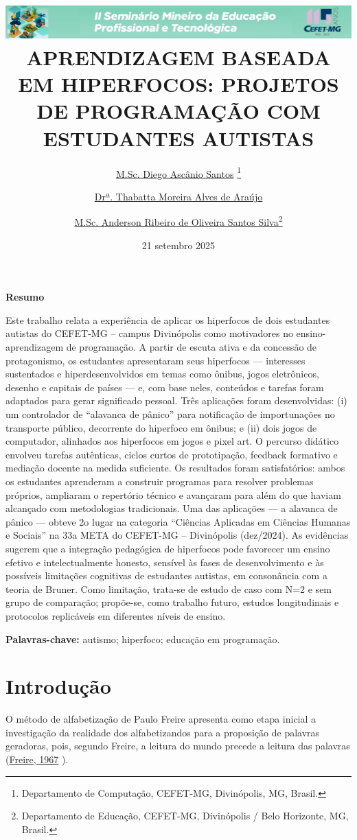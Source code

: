 \documentclass[
  12pt,
  a4paper,
]{article}
\title{\includegraphics[width=1\textwidth,height=\textheight]{./images/logo.png}
APRENDIZAGEM BASEADA EM HIPERFOCOS: PROJETOS DE PROGRAMAÇÃO COM
ESTUDANTES AUTISTAS}
\author{\href{mailto:ascanio@cefetmg.br}{M.Sc. Diego Ascânio Santos}
\thanks{Departamento de Computação, CEFET-MG, Divinópolis, MG, Brasil.} \and \href{mailto:thabatta@cefetmg.br}{Drª. Thabatta Moreira Alves de Araújo}\footnotemark[1] \and \href{mailto:andeersonribeiro@cefetmg.br}{M.Sc. Anderson Ribeiro de Oliveira Santos Silva}\thanks{Departamento de Educação, CEFET-MG, Divinópolis / Belo Horizonte, MG, Brasil.}}
\date{21 setembro 2025}
\begin{document}
\maketitle

\textbf{Resumo}

Este trabalho relata a experiência de aplicar os hiperfocos de dois
estudantes autistas do CEFET-MG -- campus Divinópolis como motivadores
no ensino-aprendizagem de programação. A partir de escuta ativa e da
concessão de protagonismo, os estudantes apresentaram seus hiperfocos
--- interesses sustentados e hiperdesenvolvidos em temas como ônibus,
jogos eletrônicos, desenho e capitais de países --- e, com base neles,
conteúdos e tarefas foram adaptados para gerar significado pessoal. Três
aplicações foram desenvolvidas: (i) um controlador de ``alavanca de
pânico'' para notificação de importunações no transporte público,
decorrente do hiperfoco em ônibus; e (ii) dois jogos de computador,
alinhados aos hiperfocos em jogos e pixel art. O percurso didático
envolveu tarefas autênticas, ciclos curtos de prototipação, feedback
formativo e mediação docente na medida suficiente. Os resultados foram
satisfatórios: ambos os estudantes aprenderam a construir programas para
resolver problemas próprios, ampliaram o repertório técnico e avançaram
para além do que haviam alcançado com metodologias tradicionais. Uma das
aplicações --- a alavanca de pânico --- obteve 2o lugar na categoria
``Ciências Aplicadas em Ciências Humanas e Sociais'' na 33a META do
CEFET-MG -- Divinópolis (dez/2024). As evidências sugerem que a
integração pedagógica de hiperfocos pode favorecer um ensino efetivo e
intelectualmente honesto, sensível às fases de desenvolvimento e às
possíveis limitações cognitivas de estudantes autistas, em consonância
com a teoria de Bruner. Como limitação, trata-se de estudo de caso com
N=2 e sem grupo de comparação; propõe-se, como trabalho futuro, estudos
longitudinais e protocolos replicáveis em diferentes níveis de ensino.

\textbf{Palavras-chave:} autismo; hiperfoco; educação em programação.

\hypertarget{sec:introducao}{%
\section{Introdução}\label{sec:introducao}}

O método de alfabetização de Paulo Freire apresenta como etapa inicial a
investigação da realidade dos alfabetizandos para a proposição de
palavras geradoras, pois, segundo Freire, a leitura do mundo precede a
leitura das palavras (\protect\hyperlink{ref-freire1967}{Freire, 1967}
).
\end{document}

